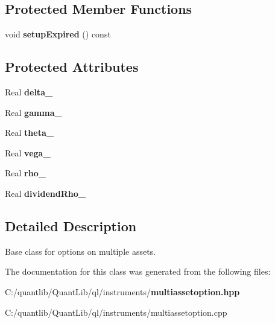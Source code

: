 \subsection*{Protected Member Functions}
\begin{DoxyCompactItemize}
\item 
void {\bfseries setup\+Expired} () const \label{class_quant_lib_1_1_multi_asset_option_a1d3076f7ec691b38ff5968ebdc72cbe4}

\end{DoxyCompactItemize}
\subsection*{Protected Attributes}
\begin{DoxyCompactItemize}
\item 
Real {\bfseries delta\+\_\+}\label{class_quant_lib_1_1_multi_asset_option_a15ec1ba72437bc618ce22aeff4c2b664}

\item 
Real {\bfseries gamma\+\_\+}\label{class_quant_lib_1_1_multi_asset_option_a1b734c00d4b96f455cccac65c4816a29}

\item 
Real {\bfseries theta\+\_\+}\label{class_quant_lib_1_1_multi_asset_option_a542375fc454d827e9769804de60a944a}

\item 
Real {\bfseries vega\+\_\+}\label{class_quant_lib_1_1_multi_asset_option_a560d57212c304108d64f9a2496267edb}

\item 
Real {\bfseries rho\+\_\+}\label{class_quant_lib_1_1_multi_asset_option_ae928d5a0223d2b0d08d65f134824e8dc}

\item 
Real {\bfseries dividend\+Rho\+\_\+}\label{class_quant_lib_1_1_multi_asset_option_a59c6208db8a249fdf66658b98d75a20f}

\end{DoxyCompactItemize}


\subsection{Detailed Description}
Base class for options on multiple assets. 

The documentation for this class was generated from the following files\+:\begin{DoxyCompactItemize}
\item 
C\+:/quantlib/\+Quant\+Lib/ql/instruments/{\bf multiassetoption.\+hpp}\item 
C\+:/quantlib/\+Quant\+Lib/ql/instruments/multiassetoption.\+cpp\end{DoxyCompactItemize}
